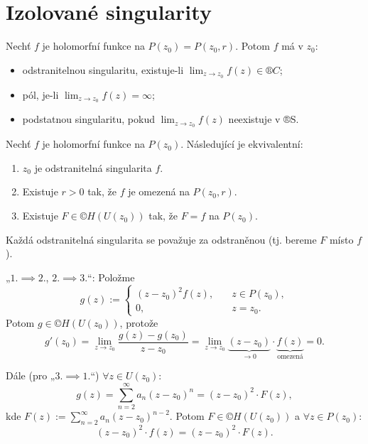 \documentclass[12pt]{article}					%
\begin{document}
\section{Izolované singularity}
\begin{definice}
	Nechť $f$ je holomorfní funkce na $P(z_0) = P(z_0, r)$. Potom $f$ má v $z_0$:
	
	\begin{itemize}
		\item odstranitelnou singularitu, existuje-li $\lim_{z \rightarrow z_0} f(z) \in ®C$;
		\item pól, je-li $\lim_{z \rightarrow z_0} f(z) = ∞$;
		\item podstatnou singularitu, pokud $\lim_{z \rightarrow z_0} f(z)$ neexistuje v ®S.
	\end{itemize}
\end{definice}

\begin{veta}
	Nechť $f$ je holomorfní funkce na $P(z_0)$. Následující je ekvivalentní:

	\begin{enumerate}
		\item $z_0$ je odstranitelná singularita $f$.
		\item Existuje $r > 0$ tak, že $f$ je omezená na $P(z_0, r)$.
		\item Existuje $F \in ©H(U(z_0))$ tak, že $F = f$ na $P(z_0)$.
	\end{enumerate}

	\begin{poznamkain}[Úmluva]
		Každá odstranitelná singularita se považuje za odstraněnou (tj. bereme $F$ místo $f$).
	\end{poznamkain}

	\begin{dukazin}
		„$1. \implies 2.$, $2. \implies 3.$“: Položme
		$$ g(z) := \begin{cases} (z - z_0)^2 f(z),& \quad z \in P(z_0),\\ 0,& \quad z = z_0. \end{cases} $$
		Potom $g \in ©H(U(z_0))$, protože
		$$ g'(z_0) = \lim_{z \rightarrow z_0} \frac{g(z) - g(z_0)}{z - z_0} = \lim_{z \rightarrow z_0} \underbrace{(z - z_0)}_{\rightarrow 0}·\underbrace{f(z)}_{\text{omezená}} = 0. $$

		Dále (pro „$3. \implies 1.$“) $\forall z \in U(z_0)$:
		$$ g(z) = \sum_{n=2}^∞ a_n(z - z_0)^n = (z-z_0)^2·F(z), $$
		kde $F(z) := \sum_{n=2}^∞ a_n(z - z_0)^{n-2}$. Potom $F \in ©H(U(z_0))$ a $\forall z \in P(z_0)$:
		$$ (z - z_0)^2·f(z) = (z - z_0)^2·F(z). $$
	\end{dukazin}
\end{veta}
\end{document}
